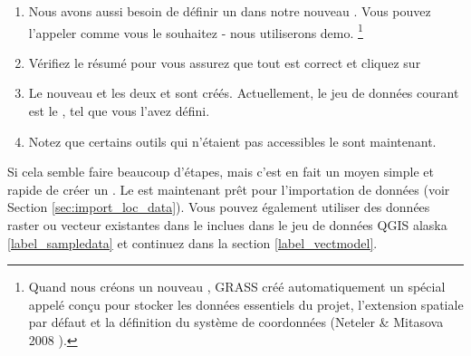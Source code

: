 \begin{enumerate}
  \item Nous avons aussi besoin de définir un  dans notre nouveau . Vous pouvez l'appeler comme vous le souhaitez - nous utiliserons demo. \footnote{Quand nous créons un nouveau , GRASS créé automatiquement un  spécial appelé  conçu pour stocker les données essentiels du projet, l'extension spatiale par défaut et la définition du système de coordonnées (Neteler \& Mitasova 2008  \cite{neteler_mitasova08}).}
  \item Vérifiez le résumé pour vous assurez que tout est correct et cliquez sur  
  \item Le nouveau  et les deux  et  sont créés. Actuellement, le jeu de données courant est le , tel que vous l'avez défini.
  \item Notez que certains outils qui n'étaient pas accessibles le sont maintenant.
\end{enumerate}


Si cela semble faire beaucoup d'étapes, mais c'est en fait un moyen simple et rapide de créer un . Le  est maintenant prêt pour l'importation de données (voir Section \ref{sec:import_loc_data}). Vous pouvez également utiliser des données raster ou vecteur existantes dans le  inclues dans le jeu de données QGIS alaska \ref{label_sampledata} et continuez dans la section \ref{label_vectmodel}.

